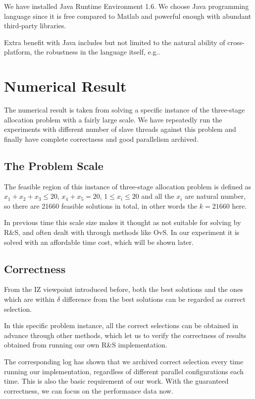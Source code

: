 \documentclass[12pt,a4]{report}
\begin{document}
We have installed Java Runtime Environment 1.6. We choose Java programming language since it is free compared to Matlab and powerful enough with abundant third-party libraries.

Extra benefit with Java includes but not limited to the natural ability of cross-platform, the robustness in the language itself, e.g..

\section{Numerical Result}

The numerical result is taken from solving a specific instance of the three-stage allocation problem with a fairly large scale. We have repeatedly run the experiments with different number of slave threads against this problem and finally have complete correctness and good parallelism archived.

\subsection{The Problem Scale}

The feasible region of this instance of three-stage allocation problem is defined as $x_1 + x_2 + x_3 \leqslant 20$, $x_4 + x_5 = 20$, $1 \leqslant x_i \leqslant 20$ and all the $x_i$ are natural number, so there are 21660 feasible solutions in total, in other words the $k = 21660$ here.

In previous time this scale size makes it thought as not suitable for solving by R\&S, and often dealt with through methods like OvS. In our experiment it is solved with an affordable time cost, which will be shown later.

\subsection{Correctness}

From the IZ viewpoint introduced before, both the best solutions and the ones which are within $\delta$ difference from the best solutions can be regarded as correct selection.

In this specific problem instance, all the correct selections can be obtained in advance through other methods, which let us to verify the correctness of results obtained from running our own R\&S implementation.

The corresponding log has shown that we archived correct selection every time running our implementation, regardless of different parallel configurations each time. This is also the basic requirement of our work. With the guaranteed correctness, we can focus on the performance data now.
\end{document}
